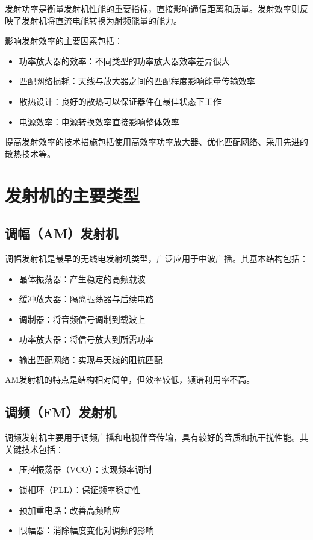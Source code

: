 \documentclass[12pt,UTF8]{ctexbook}
\begin{document}
发射功率是衡量发射机性能的重要指标，直接影响通信距离和质量。发射效率则反映了发射机将直流电能转换为射频能量的能力。

影响发射效率的主要因素包括：
\begin{itemize}[leftmargin=3.5em]
    \item 功率放大器的效率：不同类型的功率放大器效率差异很大
    \item 匹配网络损耗：天线与放大器之间的匹配程度影响能量传输效率
    \item 散热设计：良好的散热可以保证器件在最佳状态下工作
    \item 电源效率：电源转换效率直接影响整体效率
\end{itemize}

提高发射效率的技术措施包括使用高效率功率放大器、优化匹配网络、采用先进的散热技术等。

\section{发射机的主要类型}

\subsection{调幅（AM）发射机}

调幅发射机是最早的无线电发射机类型，广泛应用于中波广播。其基本结构包括：

\begin{itemize}[leftmargin=3.5em]
    \item 晶体振荡器：产生稳定的高频载波
    \item 缓冲放大器：隔离振荡器与后续电路
    \item 调制器：将音频信号调制到载波上
    \item 功率放大器：将信号放大到所需功率
    \item 输出匹配网络：实现与天线的阻抗匹配
\end{itemize}

AM发射机的特点是结构相对简单，但效率较低，频谱利用率不高。

\subsection{调频（FM）发射机}

调频发射机主要用于调频广播和电视伴音传输，具有较好的音质和抗干扰性能。其关键技术包括：

\begin{itemize}[leftmargin=3.5em]
    \item 压控振荡器（VCO）：实现频率调制
    \item 锁相环（PLL）：保证频率稳定性
    \item 预加重电路：改善高频响应
    \item 限幅器：消除幅度变化对调频的影响
\end{itemize}
\end{document}
